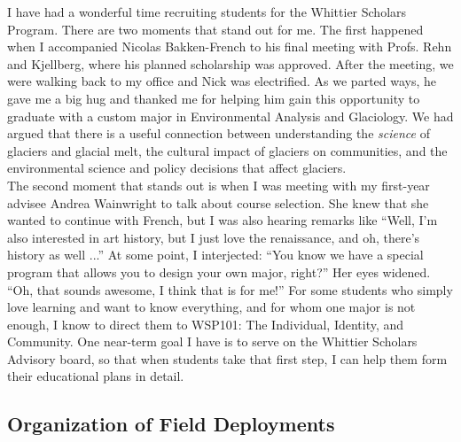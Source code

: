 \documentclass[../../../main.tex]{subfiles}
\begin{document}
I have had a wonderful time recruiting students for the Whittier Scholars Program.  There are two moments that stand out for me.  The first happened when I accompanied Nicolas Bakken-French to his final meeting with Profs. Rehn and Kjellberg, where his planned scholarship was approved.  After the meeting, we were walking back to my office and Nick was electrified.  As we parted ways, he gave me a big hug and thanked me for helping him gain this opportunity to graduate with a custom major in Environmental Analysis and Glaciology.  We had argued that there is a useful connection between understanding the \textit{science} of glaciers and glacial melt, the cultural impact of glaciers on communities, and the environmental science and policy decisions that affect glaciers.
\\
\vspace{0.25cm}
The second moment that stands out is when I was meeting with my first-year advisee Andrea Wainwright to talk about course selection.  She knew that she wanted to continue with French, but I was also hearing remarks like ``Well, I'm also interested in art history, but I just love the renaissance, and oh, there's history as well ...''  At some point, I interjected: ``You know we have a special program that allows you to design your own major, right?''  Her eyes widened.  ``Oh, that sounds awesome, I think that is for me!''  For some students who simply love learning and want to know everything, and for whom one major is not enough, I know to direct them to WSP101: The Individual, Identity, and Community.  One near-term goal I have is to serve on the Whittier Scholars Advisory board, so that when students take that first step, I can help them form their educational plans in detail.

\subsection{Organization of Field Deployments}
\end{document}

